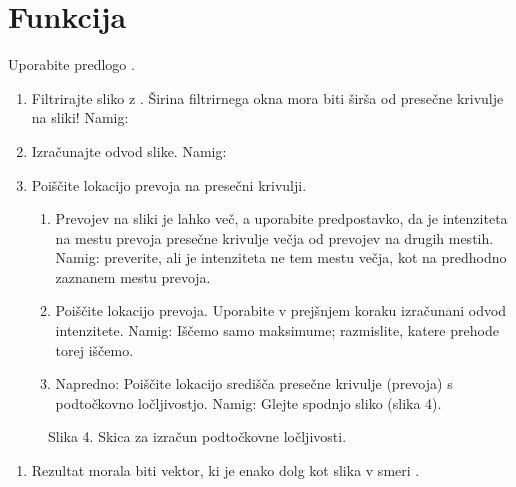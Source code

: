 \documentclass[letterpaper,10pt,english]{sphinxmanual}
\begin{document}
\section{Funkcija }
\label{\detokenize{laserskiprofilomer:funkcija-detect-profile}}
\sphinxAtStartPar
Uporabite predlogo .
\begin{enumerate}
%
\item {} 
\sphinxAtStartPar
Filtrirajte sliko z . Širina filtrirnega okna mora biti širša od presečne krivulje na sliki! Namig: 

\item {} 
\sphinxAtStartPar
Izračunajte odvod slike. Namig: 

\item {} 
\sphinxAtStartPar
Poiščite lokacijo prevoja na presečni krivulji.
\begin{enumerate}
%
\item {} 
\sphinxAtStartPar
Prevojev na sliki je lahko več, a uporabite predpostavko, da je intenziteta na mestu prevoja presečne krivulje večja od prevojev na drugih mestih. Namig: preverite, ali je intenziteta ne tem mestu večja, kot na predhodno zaznanem mestu prevoja.

\item {} 
\sphinxAtStartPar
Poiščite lokacijo prevoja. Uporabite v prejšnjem koraku izračunani odvod intenzitete. Namig: Iščemo samo maksimume; razmislite, katere prehode torej iščemo.

\item {} 
\sphinxAtStartPar
Napredno: Poiščite lokacijo središča presečne krivulje (prevoja) s podtočkovno ločljivostjo. Namig: Glejte spodnjo sliko (slika 4).

\end{enumerate}

\end{enumerate}

\begin{figure}[htbp]
\centering
\capstart

\noindent{}
\caption{Slika 4. Skica za izračun podtočkovne ločljivosti.}\label{\detokenize{laserskiprofilomer:id4}}\end{figure}
\begin{enumerate}
%
\setcounter{enumi}{3}
\item {} 
\sphinxAtStartPar
Rezultat morala biti vektor, ki je enako dolg kot slika v smeri .

\end{enumerate}
\end{document}
